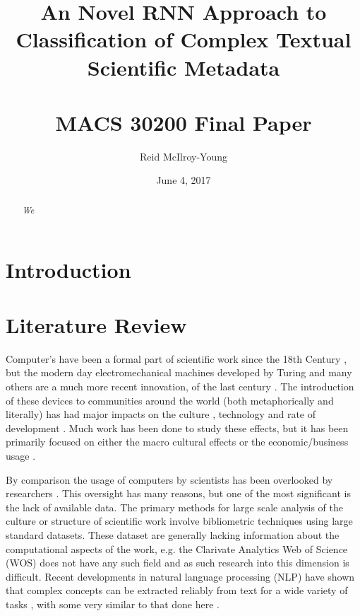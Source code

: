 \documentclass[12pt, a4paper]{article}
\author{Reid McIlroy-Young}
\title{An Novel RNN Approach to Classification of Complex Textual Scientific Metadata \\ \quad \\ \large MACS 30200 Final Paper}
\date{June 4, 2017}
\begin{document}
\maketitle
\begin{abstract}
	\thispagestyle{plain}
	\textit{
		We 
	}
\end{abstract}		
\newpage
\tableofcontents

\newpage
\setcounter{page}{1}

\section{Introduction}



\section{Literature Review}

Computer's have been a formal part of scientific work since the 18th Century \citep{grier2013computers}, but the modern day electromechanical machines developed by Turing \citep{turing1937computable} and many others \citep{abbate2012recoding}\citep{abbate2000inventing} are a much more recent innovation, of the last century \citep{bauer1972software}.  The introduction of these devices to communities around the world (both metaphorically and literally) has had major impacts on the culture \citep{lessig2007code}, technology\citep{abbate2000inventing} and rate of development \citep{bauer1972software}. Much work has been done to study these effects, but it has been primarily focused on either the macro cultural effects \citep{pfaffenberger1988social} or the economic/business usage \citep{landauer1995trouble}. 

By comparison the usage of computers by scientists has been overlooked by researchers \citep{sloanrep}. This oversight has many reasons, but one of the most significant is the lack of available data. The primary methods for large scale analysis of the culture or structure of scientific work involve bibliometric techniques \citep{de2009bibliometrics} using large standard datasets\citep[e.g.][]{Boyack2005, borner2010atlas, borner2015atlas, sugimoto2013global, shi2015weaving, evans_meta, skupin2013visualizing}. These dataset are generally lacking information about the computational aspects of the work, e.g. the  Clarivate Analytics Web of Science (WOS) does not have any such field \citep{mkdocs} and as such research into this dimension is difficult. Recent developments in natural language processing (NLP) have shown that complex concepts can be extracted reliably from text for a wide variety of tasks \citep{evans2016machine}, with some very similar to that done here \citep{foster2015tradition}.
\end{document}
